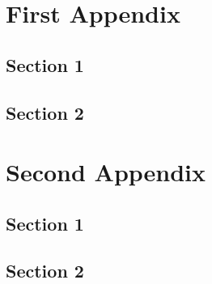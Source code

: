 \documentclass[12pt,dvipdfmx]{report}
\begin{document}
\appendix 
{}
\chapter{First Appendix}
\section{Section 1}
\section{Section 2}
\chapter{Second Appendix}
\section{Section 1}
\section{Section 2}



\end{document}
